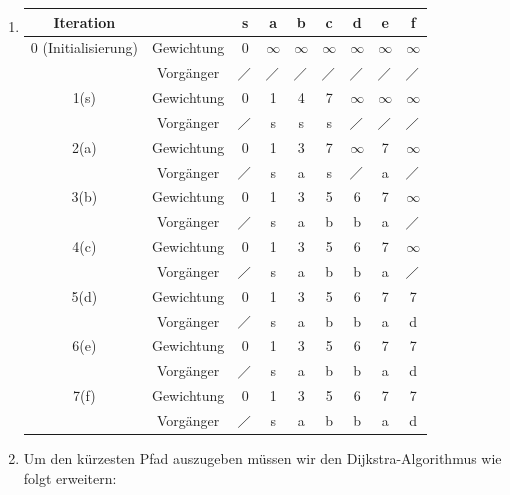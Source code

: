 \documentclass[ngerman,landscape,twocolumn]{adtexsheet}
\begin{document}
\begin{solution}
    
\begin{enumerate}
    \item
    \begin{tabular}[h]{c|c|c|c|c|c|c|c|c}
        \hline
        Iteration & & s & a & b & c & d & e & f\\
        \hline
            0 (Initialisierung)& Gewichtung & 0 & $\infty$ & $\infty$ & $\infty$ & $\infty$ & $\infty$ & $\infty$ \\
              & Vorgänger & $\diagup$ & $\diagup$ & $\diagup$ & $\diagup$ & $\diagup$ & $\diagup$ & $\diagup$\\   
        \hline
            1(s)& Gewichtung  & 0 & 1 & 4 & 7 & $\infty$ & $\infty$ & $\infty$\\
              & Vorgänger &$\diagup$ & s & s & s & $\diagup$ & $\diagup$ & $\diagup$ \\   
        \hline
            2(a)& Gewichtung  & 0 & 1 & 3 & 7 & $\infty$ & 7 & $\infty$\\
              & Vorgänger &$\diagup$ & s & a & s & $\diagup$ & a & $\diagup$ \\  
        \hline
            3(b)& Gewichtung  & 0 & 1 & 3 & 5 & 6 & 7 & $\infty$\\
              & Vorgänger &$\diagup$ & s & a & b & b & a & $\diagup$\\
        \hline
            4(c)& Gewichtung  & 0 & 1 & 3 & 5 & 6 & 7 & $\infty$\\
              & Vorgänger &$\diagup$ & s & a & b & b & a & $\diagup$\\
        \hline
            5(d)& Gewichtung  & 0 & 1 & 3 & 5 & 6 & 7 & 7\\
              & Vorgänger &$\diagup$ & s & a & b & b & a & d\\
        \hline
            6(e)& Gewichtung  & 0 & 1 & 3 & 5 & 6 & 7 & 7\\
              & Vorgänger &$\diagup$ & s & a & b & b & a & d\\
        \hline
            7(f)& Gewichtung  & 0 & 1 & 3 & 5 & 6 & 7 & 7\\
              & Vorgänger &$\diagup$ & s & a & b & b & a & d\\
    \end{tabular}
    \item Um den kürzesten Pfad auszugeben müssen wir den Dijkstra-Algorithmus wie folgt erweitern:
    

\end{enumerate}
\end{solution}
\end{document}
